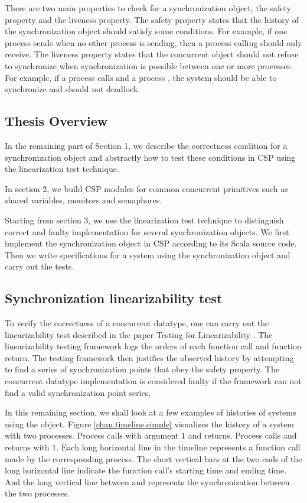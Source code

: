 \documentclass[a4paper, 12pt]{article}
\begin{document}
There are two main properties to check for a synchronization object, the safety property and the liveness property. The safety property states that the history of the synchronization object should satisfy some conditions. For example, if one process sends  when no other process is sending, then a process calling  should only receive. The liveness property states that the concurrent object should not refuse to synchronize when synchronization is possible between one or more processes. For example, if a process calls  and a process , the system should be able to synchronize and should not deadlock. 

\subsection{Thesis Overview}
In the remaining part of Section 1, we describe the correctness condition for a synchronization object and abstractly how to test these conditions in CSP using the linearization test technique. 

In section 2, we build CSP modules for common concurrent primitives such as shared variables, monitors and semaphores.

Starting from section 3, we use the linearization test technique to distinguish correct and faulty implementation for several synchronization objects. We first implement the synchronization object in CSP according to its Scala source code. Then we write specifications for a system using the synchronization object and carry out the tests.

\subsection{Synchronization linearizability test}
To verify the correctness of a concurrent datatype, one can carry out the linearizability test described in the paper Testing for Linearizability \cite{linearizability-testing}. The linearizability testing framework logs the orders of each function call and function return. The testing framework then justifies the observed history by attempting to find a series of synchronization points that obey the safety property. The concurrent datatype implementation is considered faulty if the framework can not find a valid synchronization point series. 

In this remaining section, we shall look at a few examples of histories of systems using the  object. Figure \ref{chan.timeline.simple} visualizes the history of a system with two processes. Process  calls  with argument $1$ and returns. Process  calls  and returns with $1$. Each long horizontal line in the timeline represents a function call made by the corresponding process. The short vertical bars at the two ends of the long horizontal line indicate the function call's starting time and ending time. And the long vertical line between  and  represents the synchronization between the two processes. 
\end{document}
